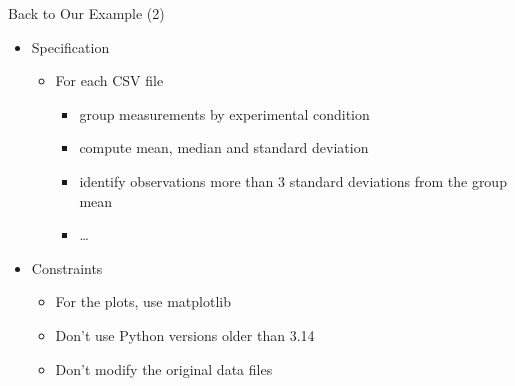 \documentclass[
ps,
]{prosper}
\begin{document}
\begin{slide}{Back to Our Example (2)}

\begin{itemize}

\item Specification

\begin{itemize}

\item For each CSV file
  
\begin{itemize}

\item group measurements by experimental condition
\item compute mean, median and standard deviation
\item identify observations more than 3 standard deviations from the group mean
\item \dots

\end{itemize}

\end{itemize}

\item Constraints

\begin{itemize}

\item For the plots, use matplotlib
\item Don't use Python versions older than 3.14
\item Don't modify the original data files

\end{itemize}

\end{itemize}


\end{slide}
\end{document}
